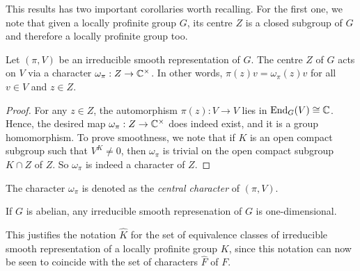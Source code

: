 This results has two important corollaries worth recalling. For the first one, we note that given a locally profinite group $G$, its centre $Z$ is a closed subgroup of $G$ and therefore a locally profinite group too.

\begin{cor}\label{cor:centralchar}
    Let $(\pi,V)$ be an irreducible smooth representation of $G$. The centre $Z$ of $G$ acts on $V$ via a character $\omega_{\pi}:Z\to\mathbb{C}^{\times}$. In other words, $\pi(z)v=\omega_{\pi}(z)v$ for all $v\in V$ and $z\in Z$.
\end{cor}

\begin{proof}
    For any $z\in Z$, the automorphism $\pi(z):V\to V$ lies in $\mathrm{End}_G(V)\cong\mathbb{C}$. Hence, the desired map $\omega_{\pi}:Z\to\mathbb{C}^{\times}$ does indeed exist, and it is a group homomorphism. To prove smoothness, we note that if $K$ is an open compact subgroup such that $V^K\neq 0$, then $\omega_{\pi}$ is trivial on the open compact subgroup $K\cap Z$ of $Z$. So $\omega_{\pi}$ is indeed a character of $Z$.
\end{proof}

The character $\omega_{\pi}$ is denoted as the \textit{central character} of $(\pi,V)$.

\begin{cor}
    If $G$ is abelian, any irreducible smooth represenation of $G$ is one-dimensional.
\end{cor}

This justifies the notation $\hat{K}$ for the set of equivalence classes of irreducible smooth representation of a locally profinite group $K$, since this notation can now be seen to coincide with the set of characters $\hat{F}$ of $F$.